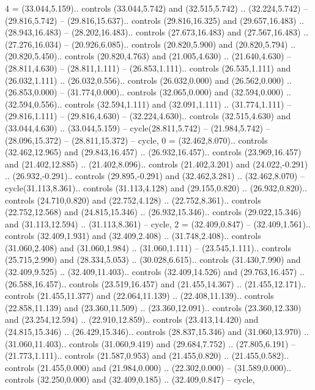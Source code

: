 {4} = {(33.044,5.159).. controls (33.044,5.742) and (32.515,5.742) .. (32.224,5.742) -- (29.816,5.742) -- (29.816,15.637).. controls (29.816,16.325) and (29.657,16.483) .. (28.943,16.483) -- (28.202,16.483).. controls (27.673,16.483) and (27.567,16.483) .. (27.276,16.034) -- (20.926,6.085).. controls (20.820,5.900) and (20.820,5.794) .. (20.820,5.450).. controls (20.820,4.763) and (21.005,4.630) .. (21.640,4.630) -- (28.811,4.630) -- (28.811,1.111) -- (26.853,1.111).. controls (26.535,1.111) and (26.032,1.111) .. (26.032,0.556).. controls (26.032,0.000) and (26.562,0.000) .. (26.853,0.000) -- (31.774,0.000).. controls (32.065,0.000) and (32.594,0.000) .. (32.594,0.556).. controls (32.594,1.111) and (32.091,1.111) .. (31.774,1.111) -- (29.816,1.111) -- (29.816,4.630) -- (32.224,4.630).. controls (32.515,4.630) and (33.044,4.630) .. (33.044,5.159) -- cycle(28.811,5.742) -- (21.984,5.742) -- (28.096,15.372) -- (28.811,15.372) -- cycle},
{0} = {(32.462,8.070).. controls (32.462,12.965) and (29.843,16.457) .. (26.932,16.457).. controls (23.969,16.457) and (21.402,12.885) .. (21.402,8.096).. controls (21.402,3.201) and (24.022,-0.291) .. (26.932,-0.291).. controls (29.895,-0.291) and (32.462,3.281) .. (32.462,8.070) -- cycle(31.113,8.361).. controls (31.113,4.128) and (29.155,0.820) .. (26.932,0.820).. controls (24.710,0.820) and (22.752,4.128) .. (22.752,8.361).. controls (22.752,12.568) and (24.815,15.346) .. (26.932,15.346).. controls (29.022,15.346) and (31.113,12.594) .. (31.113,8.361) -- cycle},
{2} = {(32.409,0.847) -- (32.409,1.561).. controls (32.409,1.931) and (32.409,2.408) .. (31.748,2.408).. controls (31.060,2.408) and (31.060,1.984) .. (31.060,1.111) -- (23.545,1.111).. controls (25.715,2.990) and (28.334,5.053) .. (30.028,6.615).. controls (31.430,7.990) and (32.409,9.525) .. (32.409,11.403).. controls (32.409,14.526) and (29.763,16.457) .. (26.588,16.457).. controls (23.519,16.457) and (21.455,14.367) .. (21.455,12.171).. controls (21.455,11.377) and (22.064,11.139) .. (22.408,11.139).. controls (22.858,11.139) and (23.360,11.509) .. (23.360,12.091).. controls (23.360,12.330) and (23.254,12.594) .. (22.910,12.859).. controls (23.413,14.420) and (24.815,15.346) .. (26.429,15.346).. controls (28.837,15.346) and (31.060,13.970) .. (31.060,11.403).. controls (31.060,9.419) and (29.684,7.752) .. (27.805,6.191) -- (21.773,1.111).. controls (21.587,0.953) and (21.455,0.820) .. (21.455,0.582).. controls (21.455,0.000) and (21.984,0.000) .. (22.302,0.000) -- (31.589,0.000).. controls (32.250,0.000) and (32.409,0.185) .. (32.409,0.847) -- cycle},
